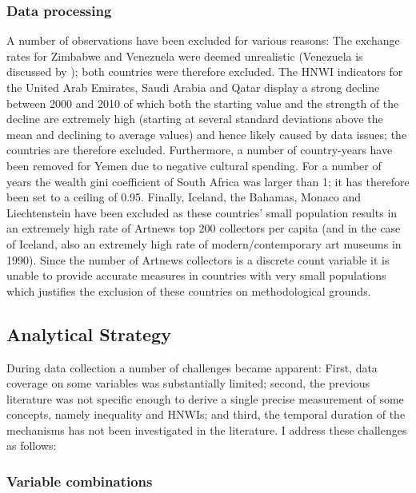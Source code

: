 \documentclass[11pt]{article}
\begin{document}
\subsubsection*{Data processing}

A number of observations have been excluded for various reasons:
The exchange rates for Zimbabwe and Venezuela were deemed unrealistic (Venezuela is discussed by \textcite{Blanchet_2017_conversions}); both countries were therefore excluded.
The HNWI indicators for the United Arab Emirates, Saudi Arabia and Qatar display a strong decline between 2000 and 2010 of which both the starting value and the strength of the decline are extremely high (starting at several standard deviations above the mean and declining to average values) and hence likely caused by data issues; the countries are therefore excluded. 
Furthermore, a number of country-years have been removed for Yemen due to negative cultural spending.
For a number of years the wealth gini coefficient of South Africa was larger than 1; it has therefore been set to a ceiling of 0.95.
Finally, Iceland, the Bahamas, Monaco and Liechtenstein have been excluded as these countries' small population results in an extremely high rate of Artnews top 200 collectors per capita (and in the case of Iceland, also an extremely high rate of modern/contemporary art museums in 1990).
Since the number of Artnews collectors is a discrete count variable it is unable to provide accurate measures in countries with very small populations which justifies the exclusion of these countries on methodological grounds.




\subsection*{Analytical Strategy}


During data collection a number of challenges became apparent:
First, data coverage on some variables was substantially limited; second, the previous literature was not specific enough to derive a single precise measurement of some concepts, namely inequality and HNWIs; and third, the temporal duration of the mechanisms has not been investigated in the literature. 
I address these challenges as follows: 

\subsubsection*{Variable combinations}
\end{document}

